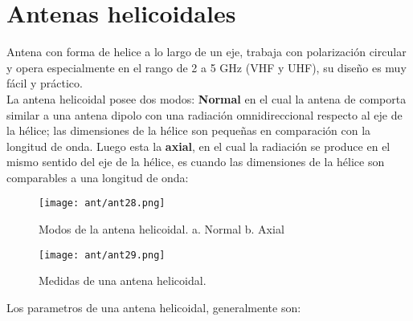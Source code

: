 \documentclass[
	12pt, %
	fleqn, %
	a4paper, %
	oneside, %
]{LegrandOrangeBook}
\begin{document}
\section{Antenas helicoidales}
Antena con forma de helice a lo largo de un eje, trabaja con polarización circular y opera especialmente en el rango de 2 a 5 GHz (VHF y UHF), su diseño es muy fácil y práctico.\\
La antena helicoidal posee dos modos: \textbf{Normal} en el cual la antena de comporta similar a una antena dipolo con una radiación omnidireccional respecto al eje de la hélice; las dimensiones de la hélice son pequeñas en comparación con la longitud de onda. Luego esta la \textbf{axial}, en el cual la radiación se produce en el mismo sentido del eje de la hélice, es cuando las dimensiones de la hélice son comparables a una longitud de onda:
\begin{figure}[H]
\centering
\texttt{[image: ant/ant28.png]}
\caption{Modos de la antena helicoidal. a. Normal b. Axial}
\label{fig:modos heli}
\end{figure}
\begin{figure}[H]
\centering
\texttt{[image: ant/ant29.png]}
\caption{Medidas de una antena helicoidal.}
\end{figure}
Los parametros de una antena helicoidal, generalmente son:
\end{document}
